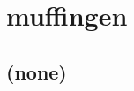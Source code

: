 
\cleardoublepage


\chapter{muffingen}\label{ch:muffingen}

\hfill \break

\newpage

\section{(none)}

